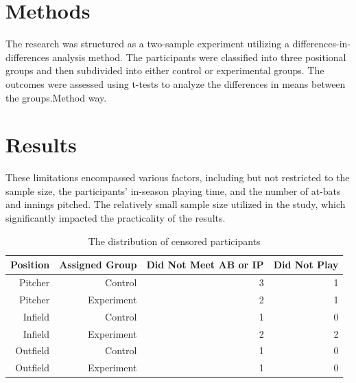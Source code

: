 \documentclass[12pt]{article}
\begin{document}
\section{Methods}
\label{sec:meth}
The research was structured as a two-sample experiment utilizing a differences-in-differences analysis method.
The participants were classified into three positional groups and then subdivided into either control or experimental groups. 
The outcomes were assessed using t-tests to analyze the differences in means between the groups.Method way\cite*{Dalmass2018baseball}.




\section{Results}
\label{sec:resu}
These limitations encompassed various factors, including but not restricted to the sample size, the participants' in-season playing time,
and the number of at-bats and innings pitched. The relatively small sample size utilized in the study, which significantly impacted the practicality of the results.

\begin{table}[tbp]
  \caption{The distribution of censored participants}
  \label{tab:rv}
\centering
\begin{tabular}{rrrr}
  \toprule
  Position & Assigned Group & Did Not Meet AB or IP & Did Not Play\\ 
  \midrule
Pitcher & Control & 3 & 1\\
Pitcher & Experiment & 2 & 1\\
Infield & Control & 1 & 0 \\
Infield & Experiment & 2 & 2\\
Outfield & Control & 1 & 0\\
Outfield & Experiment & 1 & 0\\
  \bottomrule
\end{tabular}
\end{table}
\end{document}

